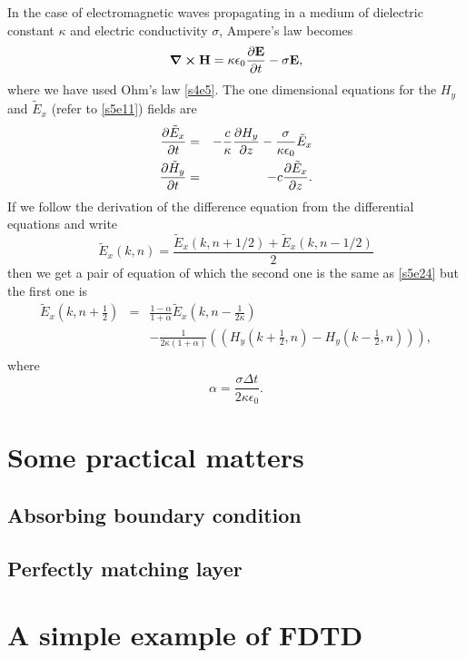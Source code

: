 \documentclass[11pt]{article}
\numberwithin{equation}{section}
\begin{document}
In the case of electromagnetic waves propagating in a medium of dielectric
constant $\kappa$ and electric conductivity $\sigma$, Ampere's law becomes
\begin{equation}\label{s5e25}
\curl\vb{H} = \kappa\epsilon_0\pdv{\vb{E}}{t} - \sigma\vb{E},
\end{equation}
where we have used Ohm's law \eqref{s4e5}. The one dimensional equations
for the $H_y$ and $\tilde{E}_x$ (refer to \eqref{s5e11}) fields are
\begin{eqnarray}
\pdv{\tilde{E}_x}{t} &=& -\frac{c}{\kappa}\pdv{H_y}{z} - 
\frac{\sigma}{\kappa\epsilon_0}\tilde{E}_x \label{s5e26} \\
\pdv{\tilde{H}_y}{t} &=& -c\pdv{\tilde{E}_x}{z}. \label{s5e27}
\end{eqnarray}
If we follow the derivation of the difference equation from the differential
equations and write 
\[
\tilde{E}_x(k, n) = \frac{\tilde{E}_x(k, n + 1/2) + \tilde{E}_x(k, n - 1/2)}{2}
\]
then we get a pair of equation of which the second one is the same as 
\eqref{s5e24} but the first one is
\begin{eqnarray}
\tilde{E}_x\left(k ,n+\frac{1}{2}\right) &=& \frac{1-\alpha}{1+\alpha}
\tilde{E}_x\left(k , n-\frac{1}{2\kappa}\right) \nonumber \\
 & & -\frac{1}{2\kappa(1 + \alpha)}\left(\left(
H_y\left(k + \frac{1}{2}, n\right) - H_y\left(k - \frac{1}{2}, n\right)\right)
\right), \nonumber \\
 & & \label{s5e28}
\end{eqnarray}
where \cite{sullivan2013electromagnetic}
\begin{equation}\label{s5e29}
\alpha = \frac{\sigma\Delta t}{2\kappa\epsilon_0}.
\end{equation}

\section{Some practical matters}\label{s6}
\subsection{Absorbing boundary condition}
\subsection{Perfectly matching layer}

\section{A simple example of FDTD}\label{s7}




\end{document}
